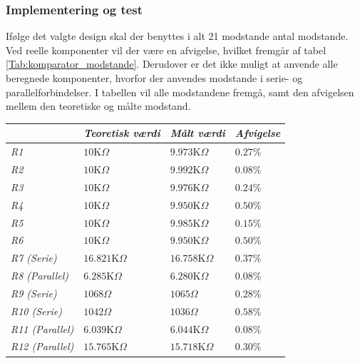 \subsubsection{Implementering og test}
Ifølge det valgte design skal der benyttes i alt 21 modstande antal modstande. Ved reelle komponenter vil der være en afvigelse, hvilket fremgår af tabel \ref{Tab:komparator_modstande}. Derudover er det ikke muligt at anvende alle beregnede komponenter, hvorfor der anvendes modstande i serie- og parallelforbindelser. I tabellen vil alle modstandene fremgå, samt den afvigelsen mellem den teoretiske og målte modstand. 
\begin{table}[H]
\centering
\begin{tabular}{|l|l|l|l|}
\hline
\textit{}               & \textit{Teoretisk værdi} & \textit{Målt værdi} & \textit{Afvigelse} \\ \hline
\textit{R1}             & $10$K$\Omega$            & $9.973$K$\Omega$    & $0.27\%$           \\ \hline
\textit{R2}             & $10$K$\Omega$            & $9.992$K$\Omega$    & $0.08\%$           \\ \hline
\textit{R3}             & $10$K$\Omega$            & $9.976$K$\Omega$    & $0.24\%$           \\ \hline
\textit{R4}             & $10$K$\Omega$            & $9.950$K$\Omega$    & $0.50\%$           \\ \hline
\textit{R5}             & $10$K$\Omega$            & $9.985$K$\Omega$    & $0.15\%$           \\ \hline
\textit{R6}             & $10$K$\Omega$            & $9.950$K$\Omega$    & $0.50\%$           \\ \hline
\textit{R7 (Serie)}     & $16.821$K$\Omega$        & $16.758$K$\Omega$   & $0.37\%$           \\ \hline
\textit{R8 (Parallel)}  & $6.285$K$\Omega$         & $6.280$K$\Omega$    & $0.08\%$           \\ \hline
\textit{R9 (Serie)}     & $1068\Omega$             & $1065\Omega$        & $0.28\%$           \\ \hline
\textit{R10 (Serie)}    & $1042\Omega$             & $1036\Omega$        & $0.58\%$           \\ \hline
\textit{R11 (Parallel)} & $6.039$K$\Omega$         & $6.044$K$\Omega$    & $0.08\%$           \\ \hline
\textit{R12 (Parallel)} & $15.765$K$\Omega$        & $15.718$K$\Omega$   & $0.30\%$           \\ \hline

\end{tabular}
\end{table}
